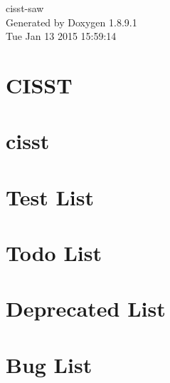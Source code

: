 \documentclass[twoside]{book}
\newcommand{\+}{\discretionary{\mbox{\scriptsize$\hookleftarrow$}}{}{}}
\newcommand{\clearemptydoublepage}{%
  \newpage{\pagestyle{empty}\cleardoublepage}%
}
\begin{document}
\hypersetup{pageanchor=false,
             bookmarks=true,
             bookmarksnumbered=true,
             pdfencoding=unicode
            }
\begin{titlepage}
\vspace*{7cm}
\begin{center}%
{\Large cisst-\/saw }\\
\vspace*{1cm}
{\large Generated by Doxygen 1.8.9.1}\\
\vspace*{0.5cm}
{\small Tue Jan 13 2015 15:59:14}\\
\end{center}
\end{titlepage}
\clearemptydoublepage
\tableofcontents
\clearemptydoublepage
{}
\hypersetup{pageanchor=true}

\chapter{C\+I\+S\+S\+T}
\label{index}\hypertarget{index}{}
\chapter{cisst}
\label{df/de1/md___users_anton_devel_cisst-saw_cisst__r_e_a_d_m_e}
\hypertarget{df/de1/md___users_anton_devel_cisst-saw_cisst__r_e_a_d_m_e}{}

\chapter{Test List}
\label{d4/df6/test}
\hypertarget{d4/df6/test}{}

\chapter{Todo List}
\label{dd/da0/todo}
\hypertarget{dd/da0/todo}{}

\chapter{Deprecated List}
\label{da/d58/deprecated}
\hypertarget{da/d58/deprecated}{}

\chapter{Bug List}
\label{de/da5/bug}
\hypertarget{de/da5/bug}{}

\end{document}
